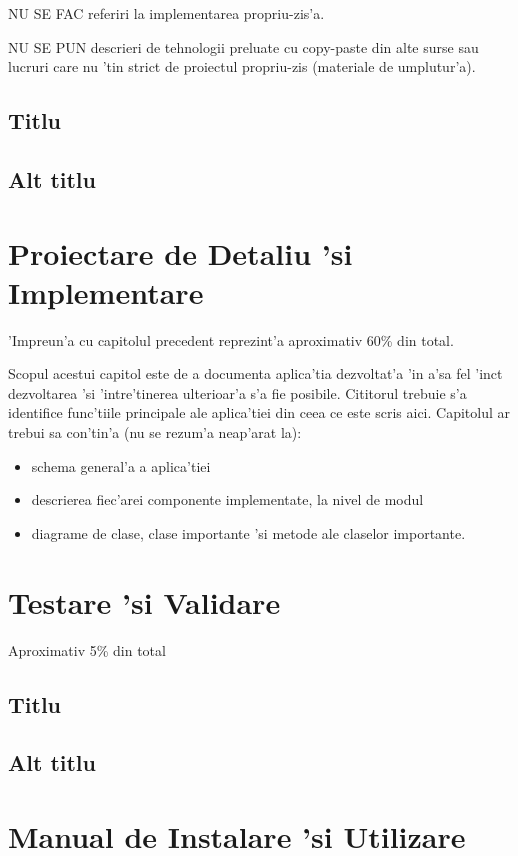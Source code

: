 \documentclass[12pt,a4paper,twoside]{report}
\begin{document}
{\color{red}
NU SE FAC referiri la implementarea propriu-zis'a. 

NU SE PUN descrieri de tehnologii preluate cu copy-paste din alte surse sau lucruri care nu 'tin strict de proiectul propriu-zis (materiale de umplutur'a).
}


\section{Titlu}
\section{Alt titlu}


\chapter{Proiectare de Detaliu 'si Implementare}

'Impreun'a cu capitolul precedent reprezint'a aproximativ 60\% din total.

Scopul acestui capitol este de a documenta aplica'tia dezvoltat'a 'in a'sa fel 'inc\ia t dezvoltarea 'si 'intre'tinerea ulterioar'a s'a fie posibile. 
Cititorul trebuie s'a identifice func'tiile principale ale aplica'tiei din ceea ce este scris aici.
Capitolul ar trebui sa con'tin'a (nu se rezum'a neap'arat la):
\begin{itemize}
 \item schema general'a a aplica'tiei
\item descrierea fiec'arei componente implementate, la nivel de modul
\item diagrame de clase, clase importante 'si metode ale claselor importante.
\end{itemize}


\chapter{Testare 'si Validare}

Aproximativ 5\% din total

\section{Titlu}
\section{Alt titlu}

\chapter{Manual de Instalare 'si Utilizare}
\end{document}
